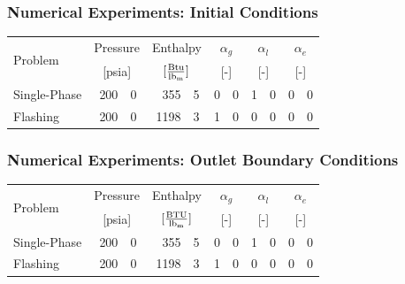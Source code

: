 \documentclass[compress,xcolor=table]{beamer}
\begin{document}
\begin{frame}
\frametitle{Numerical Experiments: Initial Conditions}

\begin{table}[ht]
\centering
\begin{tabular}{@{}lr@{.}lr@{.}lr@{.}lr@{.}lr@{.}l@{}} \toprule
\multirow{2}{*}{Problem} & \multicolumn{2}{c}{Pressure} & \multicolumn{2}{c}{Enthalpy}             & \multicolumn{2}{c}{$\alpha_g$} & \multicolumn{2}{c}{$\alpha_l$} & \multicolumn{2}{c}{$\alpha_e$} \\ 
                         & \multicolumn{2}{c}{[psia]} & \multicolumn{2}{c}{$[\frac{\text{Btu}}{\lbm{}}]$} & \multicolumn{2}{c}{[-]}      & \multicolumn{2}{c}{[-]}      & \multicolumn{2}{c}{[-]}      \\ \midrule
Single-Phase             &  200&0                       &  355&5                                   & 0&0                            & 1&0                            & 0&0 \\
Flashing                 &  200&0                       & 1198&3                                   & 1&0                            & 0&0                            & 0&0 \\ \bottomrule  
\end{tabular}
\label{tab:ic}
\end{table}

\end{frame}
\begin{frame}
\frametitle{Numerical Experiments: Outlet Boundary Conditions}

\begin{table}[ht]
\centering
\begin{tabular}{@{}lr@{.}lr@{.}lr@{.}lr@{.}lr@{.}l@{}} \toprule
\multirow{2}{*}{Problem} & \multicolumn{2}{c}{Pressure} & \multicolumn{2}{c}{Enthalpy}             & \multicolumn{2}{c}{$\alpha_g$} & \multicolumn{2}{c}{$\alpha_l$} & \multicolumn{2}{c}{$\alpha_e$} \\ 
                         & \multicolumn{2}{c}{[psia]} & \multicolumn{2}{c}{$[\frac{\text{BTU}}{\lbm{}}]$} & \multicolumn{2}{c}{[-]}      & \multicolumn{2}{c}{[-]}      & \multicolumn{2}{c}{[-]}      \\ \midrule
Single-Phase             &  200&0                       &  355&5                                   & 0&0                            & 1&0                            & 0&0 \\
Flashing                 &  200&0                       & 1198&3                                   & 1&0                            & 0&0                            & 0&0 \\ \bottomrule  
\end{tabular}
\label{tab:bc_pe}
\end{table}

\end{frame}
\end{document}
